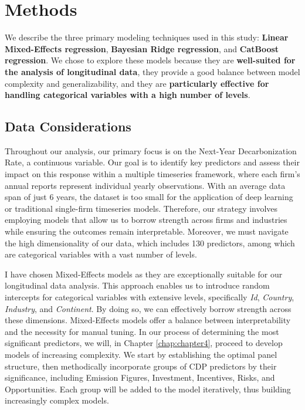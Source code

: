 \chapter{Methods}
\label{ch:methods}

\begin{keytakeaway}
    We describe the three primary modeling techniques used in this study: \textbf{Linear Mixed-Effects regression}, \textbf{Bayesian Ridge regression}, and \textbf{CatBoost regression}. We chose to explore these models because they are \textbf{well-suited for the analysis of longitudinal data}, they provide a good balance between model complexity and generalizability, and they are \textbf{particularly effective for handling categorical variables with a high number of levels}.
\end{keytakeaway}

\section{Data Considerations}
Throughout our analysis, our primary focus is on the Next-Year Decarbonization Rate, a continuous variable. Our goal is to identify key predictors and assess their impact on this response within a multiple timeseries framework, where each firm's annual reports represent individual yearly observations. With an average data span of just 6 years, the dataset is too small for the application of deep learning or traditional single-firm timeseries models. Therefore, our strategy involves employing models that allow us to borrow strength across firms and industries while ensuring the outcomes remain interpretable. Moreover, we must navigate the high dimensionality of our data, which includes 130 predictors, among which are categorical variables with a vast number of levels.

I have chosen Mixed-Effects models as they are exceptionally suitable for our longitudinal data analysis. This approach enables us to introduce random intercepts for categorical variables with extensive levels, specifically \textit{Id}, \textit{Country}, \textit{Industry}, and \textit{Continent}. By doing so, we can effectively borrow strength across these dimensions. Mixed-Effects models offer a balance between interpretability and the necessity for manual tuning. In our process of determining the most significant predictors, we will, in Chapter \ref{chap:chapter4}, proceed to develop models of increasing complexity. We start by establishing the optimal panel structure, then methodically incorporate groups of CDP predictors by their significance, including Emission Figures, Investment, Incentives, Risks, and Opportunities. Each group will be added to the model iteratively, thus building increasingly complex models. 

